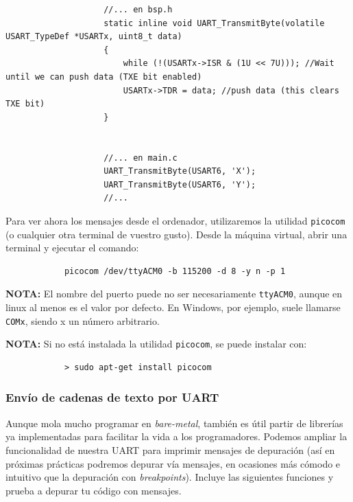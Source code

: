 \documentclass[../main.tex]{subfiles}
\begin{document}
\begin{enumerate}
                \begin{lstlisting}
                    //... en bsp.h
                    static inline void UART_TransmitByte(volatile USART_TypeDef *USARTx, uint8_t data)
                    {
                        while (!(USARTx->ISR & (1U << 7U))); //Wait until we can push data (TXE bit enabled)
                        USARTx->TDR = data; //push data (this clears TXE bit)
                    }


                    //... en main.c
                    UART_TransmitByte(USART6, 'X');
                    UART_TransmitByte(USART6, 'Y');
                    //...
                \end{lstlisting}
        \end{enumerate}
     
        Para ver ahora los mensajes desde el ordenador, utilizaremos la utilidad \texttt{picocom} (o cualquier otra terminal de vuestro gusto). Desde la máquina virtual, abrir una terminal y ejecutar el comando:

        \begin{lstlisting}
            picocom /dev/ttyACM0 -b 115200 -d 8 -y n -p 1
        \end{lstlisting}

        \textbf{NOTA:} El nombre del puerto puede no ser necesariamente \texttt{ttyACM0}, aunque en linux al menos es el valor por defecto. En Windows, por ejemplo, suele llamarse \texttt{COMx}, siendo x un número arbitrario.

        \textbf{NOTA:} Si no está instalada la utilidad \texttt{picocom}, se puede instalar con:

        \begin{lstlisting}
            > sudo apt-get install picocom
        \end{lstlisting}
        
        \subsubsection{Envío de cadenas de texto por UART}

            Aunque mola mucho programar en \emph{bare-metal}, también es útil partir de librerías ya implementadas para facilitar la vida a los programadores. Podemos ampliar la funcionalidad de nuestra UART para imprimir mensajes de depuración (así en próximas prácticas podremos depurar vía mensajes, en ocasiones más cómodo e intuitivo que la depuración con \emph{breakpoints}). Incluye las siguientes funciones y prueba a depurar tu código con mensajes.
\end{document}
